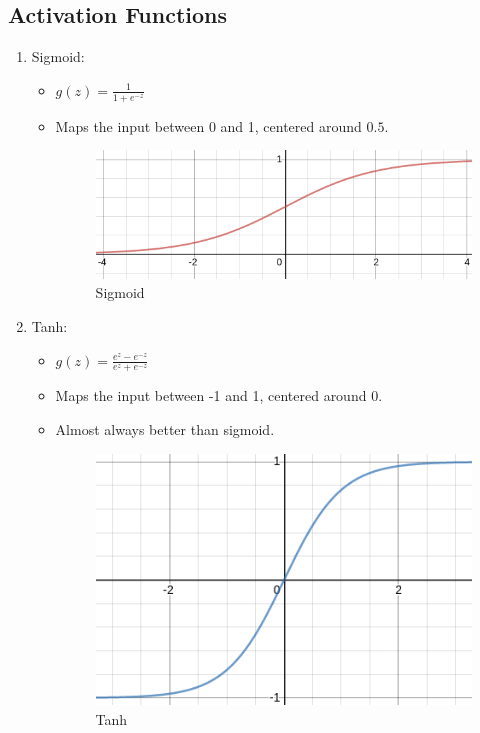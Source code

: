 \documentclass{article}
\begin{document}
	\subsection{Activation Functions}
	\begin{enumerate}
		\item Sigmoid: \begin{itemize}
			\item $g(z) = $\LARGE$\frac{1}{1+e^{-z}}$\large
			\item Maps the input between 0 and 1, centered around $0.5$.
			\begin{figure}[h]
				\centering
				\includegraphics[scale=0.5]{im/sigmoid.png}
				\caption{Sigmoid}
			\end{figure}
		\end{itemize}
		\item Tanh:\begin{itemize}
			\item $g(z) = $\LARGE$\frac{e^z-e^{-z}}{e^z+e^{-z}}$\large
			\item Maps the input between -1 and 1, centered around 0.
			\item Almost always better than sigmoid.
			\begin{figure}[h]
				\centering
				\includegraphics[scale=0.5]{im/tanh.png}
				\caption{Tanh}
			\end{figure}

\end{itemize}
\end{enumerate}
\end{document}
